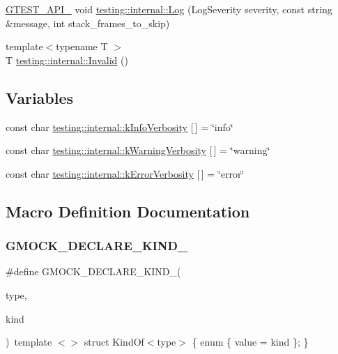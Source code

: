 \begin{DoxyCompactItemize}
\item 
\hyperlink{gtest-port_8h_aa73be6f0ba4a7456180a94904ce17790}{G\+T\+E\+S\+T\+\_\+\+A\+P\+I\+\_\+} void \hyperlink{namespacetesting_1_1internal_ac0bc151763a8187d74387c4b2ba685c9}{testing\+::internal\+::\+Log} (Log\+Severity severity, const string \&message, int stack\+\_\+frames\+\_\+to\+\_\+skip)
\item 
{\footnotesize template$<$typename T $>$ }\\T \hyperlink{namespacetesting_1_1internal_a3316c24e8a79f5def3e85d763ae50854}{testing\+::internal\+::\+Invalid} ()
\end{DoxyCompactItemize}
\subsection*{Variables}
\begin{DoxyCompactItemize}
\item 
const char \hyperlink{namespacetesting_1_1internal_a96274a788ffc75a6dffdfa8aa1f34fb9}{testing\+::internal\+::k\+Info\+Verbosity} \mbox{[}$\,$\mbox{]} = \char`\"{}info\char`\"{}
\item 
const char \hyperlink{namespacetesting_1_1internal_ad9386ccda6b6deac2f7b84784d3088c0}{testing\+::internal\+::k\+Warning\+Verbosity} \mbox{[}$\,$\mbox{]} = \char`\"{}warning\char`\"{}
\item 
const char \hyperlink{namespacetesting_1_1internal_a3d730761274e7b80dd66e5014171fcb5}{testing\+::internal\+::k\+Error\+Verbosity} \mbox{[}$\,$\mbox{]} = \char`\"{}error\char`\"{}
\end{DoxyCompactItemize}


\subsection{Macro Definition Documentation}
\mbox{\label{gmock-internal-utils_8h_a7d8a1871d7a30543a4e1882a8b2bbcd8}} 
\subsubsection{\texorpdfstring{G\+M\+O\+C\+K\+\_\+\+D\+E\+C\+L\+A\+R\+E\+\_\+\+K\+I\+N\+D\+\_\+}{GMOCK\_DECLARE\_KIND\_}}
{\footnotesize\ttfamily \#define G\+M\+O\+C\+K\+\_\+\+D\+E\+C\+L\+A\+R\+E\+\_\+\+K\+I\+N\+D\+\_\+(\begin{DoxyParamCaption}\item[{}]{type,  }\item[{}]{kind }\end{DoxyParamCaption})~template $<$$>$ struct Kind\+Of$<$type$>$ \{ enum \{ value = kind \}; \}}



